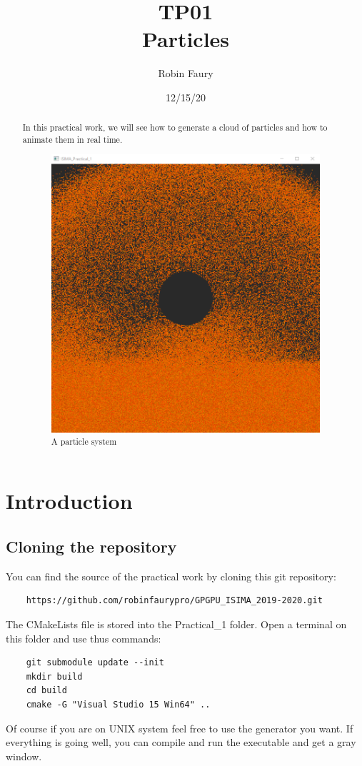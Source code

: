 \documentclass{article}
\begin{document}
\title{TP01\\Particles}
\author{Robin Faury}
\date{12/15/20}
\maketitle

\begin{abstract}
	In this practical work, we will see how to generate a cloud of particles and how to animate them in real time.
	\begin{figure}[h]
		\centering
		\includegraphics[scale=0.6]{images/result.png}
		\caption{A particle system}
	\end{figure}
\end{abstract}

\newpage
\section{Introduction}
\subsection{Cloning the repository}
You can find the source of the practical work by cloning this git repository:
\begin{lstlisting}
	https://github.com/robinfaurypro/GPGPU_ISIMA_2019-2020.git
\end{lstlisting}
The CMakeLists file is stored into the Practical\_1 folder. Open a terminal on this folder and use thus commands:
\begin{lstlisting}
	git submodule update --init
	mkdir build
	cd build
	cmake -G "Visual Studio 15 Win64" ..
\end{lstlisting}
Of course if you are on UNIX system feel free to use the generator you want.
If everything is going well, you can compile and run the executable and get a gray window.
\end{document}
